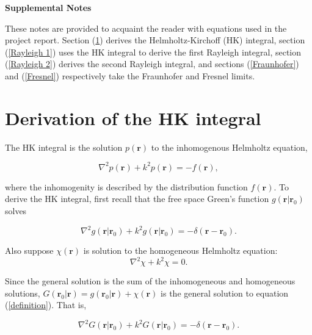 \documentclass[12pt]{article}%
\begin{document}
\begin{center}
\begin{LARGE}
\textbf{Supplemental Notes}\\
\end{LARGE}
\end{center}

These notes are provided to acquaint the reader with equations used in the project report. Section (\ref{HK}) derives the Helmholtz-Kirchoff (HK) integral, section (\ref{Rayleigh 1}) uses the HK integral to derive the first Rayleigh integral, section (\ref{Rayleigh 2}) derives the second Rayleigh integral, and sections (\ref{Fraunhofer}) and (\ref{Fresnel}) respectively take the Fraunhofer and Fresnel limits.

\section{Derivation of the HK integral}\label{HK}

The HK integral is the solution $p(\boldsymbol r)$ to the inhomogenous Helmholtz equation,

\begin{equation}\label{wave eq}
\nabla^2 p(\boldsymbol r) + k^2 p(\boldsymbol r) = -f(\boldsymbol r),  
\end{equation}

\noindent where the inhomogenity is described by the distribution function $f(\boldsymbol r)$. To derive the HK integral, first recall that the free space Green's function $g (\boldsymbol r| \boldsymbol r_0)$ solves 

\begin{equation}\label{definition}
\nabla^2 g (\boldsymbol r | \boldsymbol r_0) + k^2 g (\boldsymbol r | \boldsymbol r_0) = -\delta (\boldsymbol r - \boldsymbol r_0).
\end{equation}

\noindent Also suppose $\chi(\boldsymbol r)$ is solution to the homogeneous Helmholtz equation:
\begin{equation}\label{homo}
    \nabla^2 \chi + k^2 \chi = 0.
\end{equation}


\noindent Since the general solution is the sum of the inhomogeneous and homogeneous solutions,  $G(\boldsymbol r_0| \boldsymbol r) = g(\boldsymbol r_0| \boldsymbol r) + \chi (\boldsymbol r)$ is the general solution to equation (\ref{definition}). That is,

\begin{equation}\label{forbigG}
\nabla^2 G (\boldsymbol r | \boldsymbol r_0) + k^2 G (\boldsymbol r | \boldsymbol r_0) = -\delta (\boldsymbol r - \boldsymbol r_0).
\end{equation}
\end{document}
